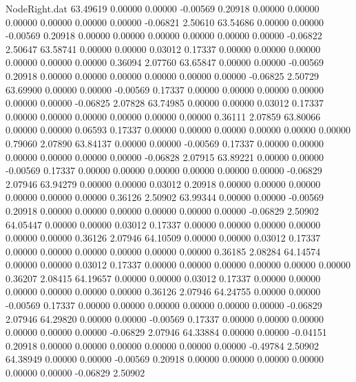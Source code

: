 \begin{filecontents}{NodeRight.dat}
  63.49619    0.00000    0.00000    -0.00569    0.20918    0.00000    0.00000    0.00000    0.00000    0.00000    0.00000   -0.06821    2.50610
  63.54686    0.00000    0.00000    -0.00569    0.20918    0.00000    0.00000    0.00000    0.00000    0.00000    0.00000   -0.06822    2.50647
  63.58741    0.00000    0.00000     0.03012    0.17337    0.00000    0.00000    0.00000    0.00000    0.00000    0.00000    0.36094    2.07760
  63.65847    0.00000    0.00000    -0.00569    0.20918    0.00000    0.00000    0.00000    0.00000    0.00000    0.00000   -0.06825    2.50729
  63.69900    0.00000    0.00000    -0.00569    0.17337    0.00000    0.00000    0.00000    0.00000    0.00000    0.00000   -0.06825    2.07828
  63.74985    0.00000    0.00000     0.03012    0.17337    0.00000    0.00000    0.00000    0.00000    0.00000    0.00000    0.36111    2.07859
  63.80066    0.00000    0.00000     0.06593    0.17337    0.00000    0.00000    0.00000    0.00000    0.00000    0.00000    0.79060    2.07890
  63.84137    0.00000    0.00000    -0.00569    0.17337    0.00000    0.00000    0.00000    0.00000    0.00000    0.00000   -0.06828    2.07915
  63.89221    0.00000    0.00000    -0.00569    0.17337    0.00000    0.00000    0.00000    0.00000    0.00000    0.00000   -0.06829    2.07946
  63.94279    0.00000    0.00000     0.03012    0.20918    0.00000    0.00000    0.00000    0.00000    0.00000    0.00000    0.36126    2.50902
  63.99344    0.00000    0.00000    -0.00569    0.20918    0.00000    0.00000    0.00000    0.00000    0.00000    0.00000   -0.06829    2.50902
  64.05447    0.00000    0.00000     0.03012    0.17337    0.00000    0.00000    0.00000    0.00000    0.00000    0.00000    0.36126    2.07946
  64.10509    0.00000    0.00000     0.03012    0.17337    0.00000    0.00000    0.00000    0.00000    0.00000    0.00000    0.36185    2.08284
  64.14574    0.00000    0.00000     0.03012    0.17337    0.00000    0.00000    0.00000    0.00000    0.00000    0.00000    0.36207    2.08415
  64.19657    0.00000    0.00000     0.03012    0.17337    0.00000    0.00000    0.00000    0.00000    0.00000    0.00000    0.36126    2.07946
  64.24755    0.00000    0.00000    -0.00569    0.17337    0.00000    0.00000    0.00000    0.00000    0.00000    0.00000   -0.06829    2.07946
  64.29820    0.00000    0.00000    -0.00569    0.17337    0.00000    0.00000    0.00000    0.00000    0.00000    0.00000   -0.06829    2.07946
  64.33884    0.00000    0.00000    -0.04151    0.20918    0.00000    0.00000    0.00000    0.00000    0.00000    0.00000   -0.49784    2.50902
  64.38949    0.00000    0.00000    -0.00569    0.20918    0.00000    0.00000    0.00000    0.00000    0.00000    0.00000   -0.06829    2.50902

\end{filecontents}
